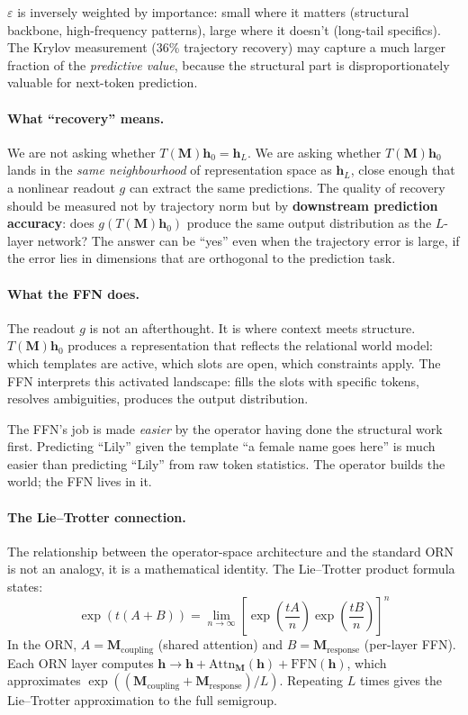 \documentclass[11pt, a4paper]{article}
\newcommand{\M}{\mathbf{M}}
\newcommand{\h}{\mathbf{h}}
\theoremstyle{plain}
\theoremstyle{definition}
\theoremstyle{remark}
\begin{document}
$\varepsilon$ is inversely weighted by importance: small where it matters (structural backbone, high-frequency patterns), large where it doesn't (long-tail specifics).
The Krylov measurement (36\% trajectory recovery) may capture a much larger fraction of the \emph{predictive value}, because the structural part is disproportionately valuable for next-token prediction.

\paragraph{What ``recovery'' means.}
We are not asking whether $T(\M) \h_0 = \h_L$.
We are asking whether $T(\M) \h_0$ lands in the \emph{same neighbourhood} of representation space as $\h_L$, close enough that a nonlinear readout $g$ can extract the same predictions.
The quality of recovery should be measured not by trajectory norm but by \textbf{downstream prediction accuracy}: does $g(T(\M) \h_0)$ produce the same output distribution as the $L$-layer network?
The answer can be ``yes'' even when the trajectory error is large, if the error lies in dimensions that are orthogonal to the prediction task.

\paragraph{What the FFN does.}
The readout $g$ is not an afterthought.
It is where context meets structure.
$T(\M) \h_0$ produces a representation that reflects the relational world model: which templates are active, which slots are open, which constraints apply.
The FFN interprets this activated landscape: fills the slots with specific tokens, resolves ambiguities, produces the output distribution.

The FFN's job is made \emph{easier} by the operator having done the structural work first.
Predicting ``Lily'' given the template ``a female name goes here'' is much easier than predicting ``Lily'' from raw token statistics.
The operator builds the world; the FFN lives in it.

\paragraph{The Lie--Trotter connection.}
The relationship between the operator-space architecture and the standard ORN is not an analogy, it is a mathematical identity.
The Lie--Trotter product formula states:
\begin{equation}
\exp(t(A + B)) = \lim_{n \to \infty} \left[\exp\!\left(\frac{tA}{n}\right) \exp\!\left(\frac{tB}{n}\right)\right]^n
\end{equation}
In the ORN, $A = \M_{\mathrm{coupling}}$ (shared attention) and $B = \M_{\mathrm{response}}$ (per-layer FFN).
Each ORN layer computes $\h \to \h + \mathrm{Attn}_\M(\h) + \mathrm{FFN}(\h)$, which approximates $\exp((\M_{\mathrm{coupling}} + \M_{\mathrm{response}})/L)$.
Repeating $L$ times gives the Lie--Trotter approximation to the full semigroup.
\end{document}
